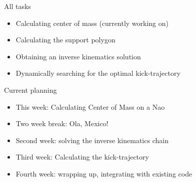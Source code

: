 \documentclass{beamer}
\begin{document}
\begin{frame}{All tasks}
    \begin{itemize}
        \item{Calculating center of mass (currently working on)}
        \item{Calculating the support polygon}
        \item{Obtaining an inverse kinematics solution}
        \item{Dynamically searching for the optimal kick-trajectory}
    \end{itemize}
\end{frame}

\begin{frame}{Current planning}
    \begin{itemize}
    \item{This week: Calculating Center of Mass on a Nao}
    \item{Two week break: Ola, Mexico!}
    \item{Second week: solving the inverse kinematics chain}
    \item{Third week: Calculating the kick-trajectory}
    \item{Fourth week: wrapping up, integrating with existing code} 
    \end{itemize}
\end{frame}
\end{document}
